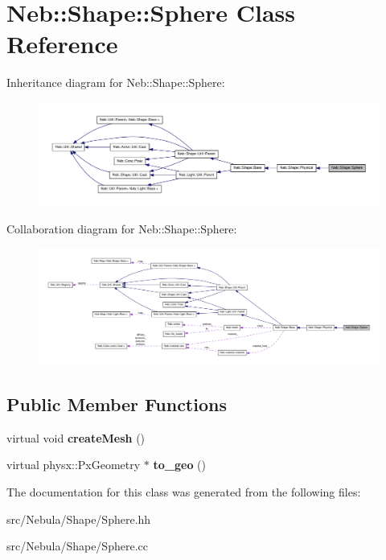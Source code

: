 \hypertarget{classNeb_1_1Shape_1_1Sphere}{\section{\-Neb\-:\-:\-Shape\-:\-:\-Sphere \-Class \-Reference}
\label{classNeb_1_1Shape_1_1Sphere}
}


\-Inheritance diagram for \-Neb\-:\-:\-Shape\-:\-:\-Sphere\-:\nopagebreak
\begin{figure}[H]
\begin{center}
\leavevmode
\includegraphics[width=350pt]{classNeb_1_1Shape_1_1Sphere__inherit__graph}
\end{center}
\end{figure}


\-Collaboration diagram for \-Neb\-:\-:\-Shape\-:\-:\-Sphere\-:\nopagebreak
\begin{figure}[H]
\begin{center}
\leavevmode
\includegraphics[width=350pt]{classNeb_1_1Shape_1_1Sphere__coll__graph}
\end{center}
\end{figure}
\subsection*{\-Public \-Member \-Functions}
\begin{DoxyCompactItemize}
\item 
\hypertarget{classNeb_1_1Shape_1_1Sphere_ad89afdc0033748431e0c06da103b491a}{virtual void {\bfseries create\-Mesh} ()}\label{classNeb_1_1Shape_1_1Sphere_ad89afdc0033748431e0c06da103b491a}

\item 
\hypertarget{classNeb_1_1Shape_1_1Sphere_a6285cbdf24b70179007594a2223dbf1f}{virtual physx\-::\-Px\-Geometry $\ast$ {\bfseries to\-\_\-geo} ()}\label{classNeb_1_1Shape_1_1Sphere_a6285cbdf24b70179007594a2223dbf1f}

\end{DoxyCompactItemize}


\-The documentation for this class was generated from the following files\-:\begin{DoxyCompactItemize}
\item 
src/\-Nebula/\-Shape/\-Sphere.\-hh\item 
src/\-Nebula/\-Shape/\-Sphere.\-cc\end{DoxyCompactItemize}

